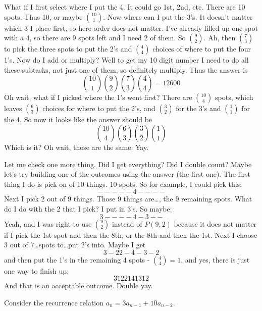 \documentclass[10pt]{exam}
\begin{document}
\begin{questions}
\begin{solution}
What if I first select where I put the 4.  It could go 1st, 2nd, etc.  There are 10 spots.  Thus 10, or maybe ${10 \choose 1}$.  Now where can I put the 3's.  It doesn't matter which 3 I place first, so here order does not matter.  I've already filled up one spot with a 4, so there are 9 spots left and I need 2 of them.  So ${9 \choose 2}$.  Ah, then ${7 \choose 3}$ to pick the three spots to put the 2's and ${4 \choose 4}$ choices of where to put the four 1's.  Now do I add or multiply?  Well to get my 10 digit number I need to do all these subtasks, not just one of them, so definitely multiply.  Thus the answer is
\[{10 \choose 1}{9 \choose 2}{7 \choose 3}{4 \choose 4} = 12600\]
Oh wait, what if I picked where the 1's went first?  There are ${10 \choose 4}$ spots, which leaves ${6 \choose 3}$ choices for where to put the 2's, and ${3 \choose 2}$ for the 3's and ${1 \choose 1}$ for the 4.  So now it looks like the answer should be
\[{10 \choose 4}{6 \choose 3}{3 \choose 2}{1 \choose 1}\]
Which is it?  Oh wait, those are the same.  Yay.

Let me check one more thing.  Did I get everything?  Did I double count?  Maybe let's try building one of the outcomes using the answer (the first one).  The first thing I do is pick on of 10 things.  10 spots.  So for example, I could pick this:
\[- - - - - ~ 4 - - - -\]
Next I pick 2 out of 9 things.  Those 9 things are\ldots, the 9 remaining spots.  What do I do with the 2 that I pick?  I put in 3's.  So maybe:
\[3 - - - - ~ 4 - 3 - -\]
Yeah, and I was right to use ${9 \choose 2}$ instead of $P(9,2)$ because it does not matter if I pick the 1st spot and then the 8th, or the 8th and then the 1st.  Next I choose 3 out of 7\ldots spots to\ldots put 2's into.  Maybe I get
\[3 - 2 2 - 4 - 3 - 2\]
and then put the 1's in the remaining 4 spots - ${4 \choose 4} = 1$, and yes, there is just one way to finish up:
\[3 1 22141312\]
And that is an acceptable outcome.  Double yay.
\end{solution}



\question[6] Consider the recurrence relation $a_n = 3a_{n-1} + 10a_{n-2}$.

\end{questions}
\end{document}
